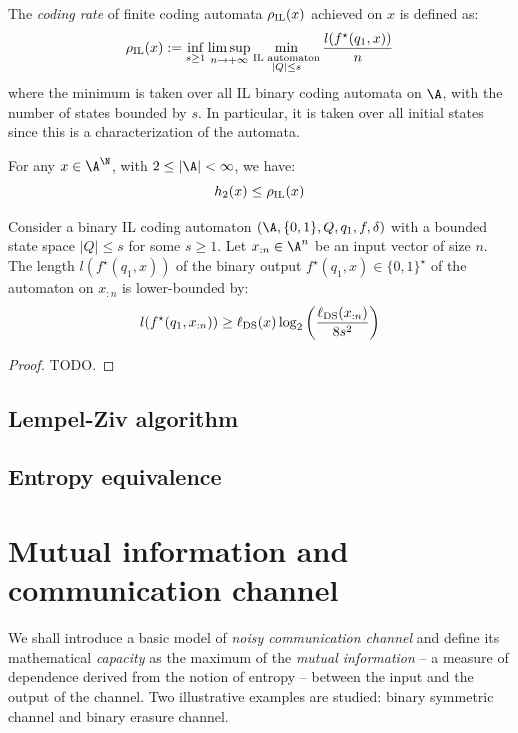 \documentclass[toc, titlepaged]{../cs-classes/cs-classes}
\newcommand*{\lds}{\ell_{\textnormal{DS}}}
\begin{document}
\begin{definition}
    The \emph{coding rate} of finite coding automata $\rho_{\textnormal{IL}}(x)$ achieved on $x$ is defined as:
    \begin{equation*}
        \rho_{\textnormal{IL}}(x) := \inf_{s\geq1}\limsup_{n\to+\infty} \min_{\substack{\textnormal{IL automaton}\\|Q|\leq s}} \frac{l(f^\star(q_1, x))}{n}
    \end{equation*}
    where the minimum is taken over all IL binary coding automata on $\A$, with the number of states bounded by $s$. In particular, it is taken over all initial states since this is a characterization of the automata.
\end{definition}

\begin{property}
    For any $x\in\A^\N$, with $2\leq|\A|<\infty$, we have:
    \begin{equation*}
        h_2(x)\leq\rho_{\textnormal{IL}}(x)
    \end{equation*}
\end{property}

\begin{lemma}
    Consider a binary IL coding automaton $(\A, \{0, 1\}, Q, q_1, f, \delta)$ with a bounded state space $|Q|\leq s$ for some $s\geq1$. Let $x_{:n}\in\A^n$ be an input vector of size $n$. The length $l(f^\star(q_1, x))$ of the binary output $f^\star(q_1, x)\in\{0, 1\}^\star$ of the automaton on $x_{:n}$ is lower-bounded by:
    \begin{equation*}
        l(f^\star(q_1, x_{:n})) \geq \lds(x) \log_2\left(\frac{\lds(x_{:n})}{8s^2}\right)
    \end{equation*}
\end{lemma}

\begin{proof}
    TODO.
\end{proof}

\subsection{Lempel-Ziv algorithm}

\subsection{Entropy equivalence}


\section{Mutual information and communication channel}
We shall introduce a basic model of \emph{noisy communication channel} and define its mathematical \emph{capacity} as the maximum of the \emph{mutual information} -- a measure of dependence derived from the notion of entropy -- between the input and the output of the channel. Two illustrative examples are studied: binary symmetric channel and binary erasure channel.
\end{document}
